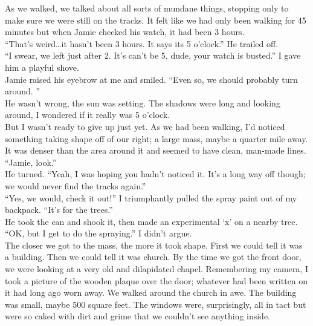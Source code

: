 \documentclass[a5paper]{scrartcl}
\begin{document}
As we walked, we talked about all sorts of mundane things, stopping only to make sure we were still on the tracks. It felt like we had only been walking for 45 minutes but when Jamie checked his watch, it had been 3 hours.\\


\enquote{That's weird\dots it hasn't been 3 hours. It says its 5 o'clock.} He trailed off.\\


\enquote{I swear, we left just after 2. It's can't be 5, dude, your watch is busted.} I gave him a playful shove.\\


Jamie raised his eyebrow at me and smiled. \enquote{Even so, we should probably turn around. }\\


He wasn't wrong, the sun was setting. The shadows were long and looking around, I wondered if it really was 5 o'clock. \\


But I wasn't ready to give up just yet. As we had been walking, I'd noticed something taking shape off of our right; a large mass, maybe a quarter mile away. It was denser than the area around it and seemed to have clean, man-made lines. \\


\enquote{Jamie, look.} \\


He turned. \enquote{Yeah, I was hoping you hadn't noticed it. It's a long way off though; we would never find the tracks again.}\\


\enquote{Yes, we would, check it out!} I triumphantly pulled the spray paint out of my backpack. \enquote{It's for the trees.}\\


He took the can and shook it, then made an experimental ‘x' on a nearby tree. \\


\enquote{OK, but I get to do the spraying.} I didn't argue.\\


The closer we got to the mass, the more it took shape. First we could tell it was a building. Then we could tell it was church.  By the time we got the front door, we were looking at a very old and dilapidated chapel. Remembering my camera, I took a picture of the wooden plaque over the door; whatever had been written on it had long ago worn away. We walked around the church in awe. The building was small, maybe 500 square feet. The windows were, surprisingly, all in tact but were so caked with dirt and grime that we couldn't see anything inside. \\
\end{document}
